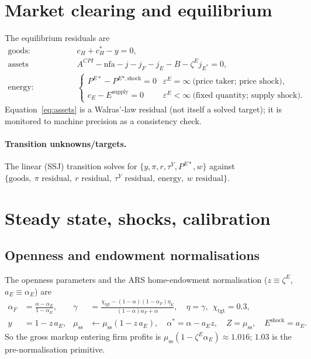 \documentclass[11pt]{article}
\newcommand{\stst}{\mathrm{ss}}
\begin{document}
\section{Market clearing and equilibrium}\label{sec:clearing}

The equilibrium residuals are
\begin{align}
\text{goods:}&\quad c_H+c_H^{*}-y=0, \label{eq:goods}\\
\text{assets (Walras):}&\quad A^{CPI}-\mathrm{nfa}-j-j_F-j_E-B-\zeta^{E}j_{E^{*}}=0, \label{eq:assets}\\
\text{energy:}&\quad
\begin{cases}
P^{E*}-P^{E*,\text{shock}}=0 & \varepsilon^{E}=\infty\ \text{(price taker; price shock)},\\
c_E-E^{\text{supply}}=0 & \varepsilon^{E}<\infty\ \text{(fixed quantity; supply shock).}
\end{cases}\label{eq:energy}
\end{align}
Equation~\eqref{eq:assets} is a Walras'-law residual (not itself a solved
target); it is monitored to machine precision as a consistency check.

\paragraph{Transition unknowns/targets.} The linear (SSJ) transition solves for
$\{y,\pi,r,\tau^{Y},P^{E*},w\}$ against
$\{\text{goods},\ \pi\text{ residual},\ r\text{ residual},\ \tau^{Y}\text{ residual},
\ \text{energy},\ w\text{ residual}\}$.

\section{Steady state, shocks, calibration}\label{sec:ss}

\subsection{Openness and endowment normalisations}

The openness parameters and the ARS home-endowment normalisation
($z\equiv\zeta^{E}$, $a_E\equiv\alpha_E$) are
\begin{align}
\alpha_F&=\frac{\alpha-\alpha_E}{1-\alpha_E}, &
\gamma&=\frac{\chi_{\text{tgt}}-(1-\alpha)(1-\alpha_F)\eta_E}{(1-\alpha)\alpha_F+\alpha},\quad \eta=\gamma,\ \ \chi_{\text{tgt}}=0.3,\\
y&=1-z\,a_E, & \mu_{\stst}&\leftarrow\mu_{\stst}(1-z\,a_E),\quad
\alpha^{*}=\alpha-a_E z,\quad Z=\mu_{\stst},\quad E^{\text{shock}}=a_E .
\end{align}
So the gross markup entering firm profits is $\mu_{\stst}(1-\zeta^{E}\alpha_E)\approx 1.016$;
$1.03$ is the pre-normalisation primitive.
\end{document}
